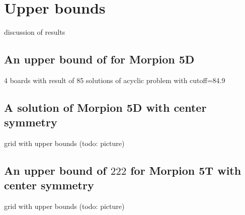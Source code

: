 \section{Upper bounds}

  discussion of results
  
\subsection{An upper bound of \therecord for Morpion 5D}

  4 boards with result of 85
  solutions of acyclic problem with cutoff=84.9

\subsection{A solution of Morpion 5D with center symmetry}

  grid with upper bounds (todo: picture)
  
\subsection{An upper bound of $222$ for Morpion 5T with center symmetry}

  grid with upper bounds (todo: picture)
